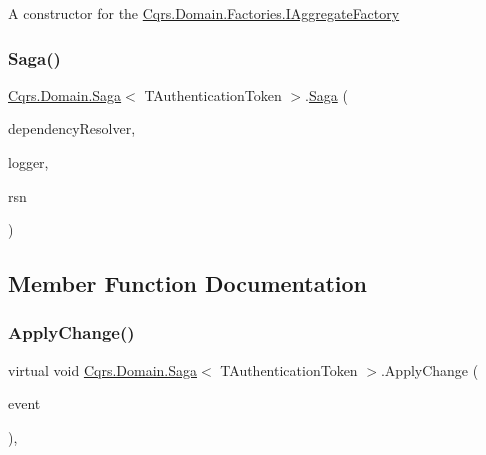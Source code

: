 A constructor for the \hyperlink{interfaceCqrs_1_1Domain_1_1Factories_1_1IAggregateFactory}{Cqrs.\+Domain.\+Factories.\+I\+Aggregate\+Factory} 

\mbox{\label{classCqrs_1_1Domain_1_1Saga_acba7142c5e3ad568a60dc365fb7e8733_acba7142c5e3ad568a60dc365fb7e8733}} 
\subsubsection{\texorpdfstring{Saga()}{Saga()}\hspace{0.1cm}{\footnotesize\ttfamily [3/3]}}
{\footnotesize\ttfamily \hyperlink{classCqrs_1_1Domain_1_1Saga}{Cqrs.\+Domain.\+Saga}$<$ T\+Authentication\+Token $>$.\hyperlink{classCqrs_1_1Domain_1_1Saga}{Saga} (\begin{DoxyParamCaption}\item[{\hyperlink{interfaceCqrs_1_1Configuration_1_1IDependencyResolver}{I\+Dependency\+Resolver}}]{dependency\+Resolver,  }\item[{I\+Logger}]{logger,  }\item[{Guid}]{rsn }\end{DoxyParamCaption})\hspace{0.3cm}{\ttfamily [protected]}}



\subsection{Member Function Documentation}
\mbox{\label{classCqrs_1_1Domain_1_1Saga_af8a1eddbadc8fc3fb69f18691f3b08ac_af8a1eddbadc8fc3fb69f18691f3b08ac}} 
\subsubsection{\texorpdfstring{Apply\+Change()}{ApplyChange()}\hspace{0.1cm}{\footnotesize\ttfamily [1/2]}}
{\footnotesize\ttfamily virtual void \hyperlink{classCqrs_1_1Domain_1_1Saga}{Cqrs.\+Domain.\+Saga}$<$ T\+Authentication\+Token $>$.Apply\+Change (\begin{DoxyParamCaption}\item[{\hyperlink{interfaceCqrs_1_1Events_1_1ISagaEvent}{I\+Saga\+Event}$<$ T\+Authentication\+Token $>$ @}]{event }\end{DoxyParamCaption})\hspace{0.3cm}{\ttfamily [protected]}, {\ttfamily [virtual]}}

